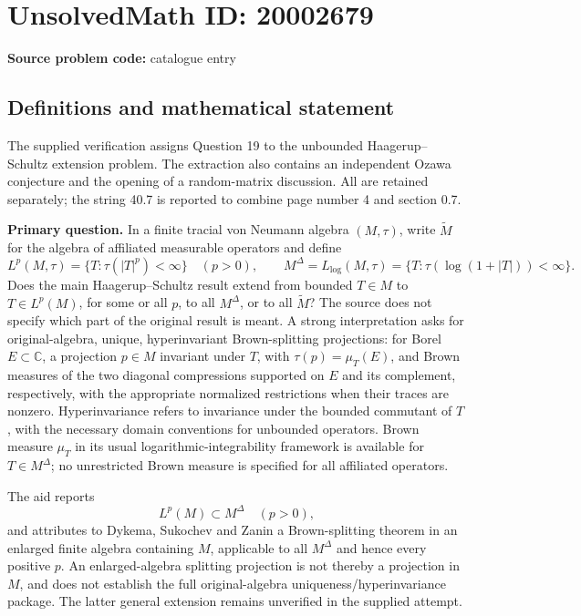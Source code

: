 \documentclass[11pt]{article}
\newcommand{\C}{\mathbb{C}}
\begin{document}
\section*{UnsolvedMath ID: 20002679}
\textbf{Source problem code:} catalogue entry
\subsection{Definitions and mathematical statement}
The supplied verification assigns Question 19 to the unbounded Haagerup--Schultz extension problem. The extraction also contains an independent Ozawa conjecture and the opening of a random-matrix discussion. All are retained separately; the string 40.7 is reported to combine page number 4 and section 0.7.

\textbf{Primary question.} In a finite tracial von Neumann algebra \((M,\tau)\), write \(\widetilde M\) for the algebra of affiliated measurable operators and define
\[
 L^p(M,\tau)=\{T:\tau(|T|^p)<\infty\}\quad(p>0),\qquad
 M^\Delta=L_{\log}(M,\tau)
       =\{T:\tau(\log(1+|T|))<\infty\}.
\]
Does the main Haagerup--Schultz result extend from bounded \(T\in M\) to \(T\in L^p(M)\), for some or all \(p\), to all \(M^\Delta\), or to all \(\widetilde M\)? The source does not specify which part of the original result is meant. A strong interpretation asks for original-algebra, unique, hyperinvariant Brown-splitting projections: for Borel \(E\subset\C\), a projection \(p\in M\) invariant under \(T\), with \(\tau(p)=\mu_T(E)\), and Brown measures of the two diagonal compressions supported on \(E\) and its complement, respectively, with the appropriate normalized restrictions when their traces are nonzero. Hyperinvariance refers to invariance under the bounded commutant of \(T\), with the necessary domain conventions for unbounded operators. Brown measure \(\mu_T\) in its usual logarithmic-integrability framework is available for \(T\in M^\Delta\); no unrestricted Brown measure is specified for all affiliated operators.

The aid reports
\[
 L^p(M)\subset M^\Delta\quad(p>0),
\]
and attributes to Dykema, Sukochev and Zanin a Brown-splitting theorem in an enlarged finite algebra containing \(M\), applicable to all \(M^\Delta\) and hence every positive \(p\). An enlarged-algebra splitting projection is not thereby a projection in \(M\), and does not establish the full original-algebra uniqueness/hyperinvariance package. The latter general extension remains unverified in the supplied attempt.
\end{document}
